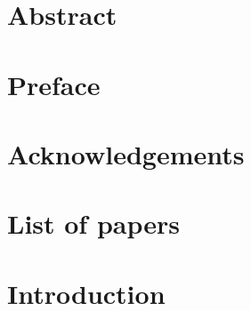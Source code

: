 \documentclass[11pt,b5paper,onecolumn,titlepage,openright,twoside,final]{book}
\begin{document}
\newcommand{\bv}[1]{\mathbfup{#1}}
\newcommand{\bvh}[1]{\hat{\bv{#1}}}
\newcommand{\dd}[0]{\text{d}}
\newcommand{\red}{\color{Red}}
\newcommand{\blu}{\color{Blu}}
\newcommand{\green}{\color{Green}}
\newcommand{\purple}{\color{Purple}}

\pagestyle{empty}
\frontmatter
\chapter*{Abstract}


\chapter*{Preface}


\chapter*{Acknowledgements}


\chapter*{List of papers}


% 

\tableofcontents
\mainmatter

\pagestyle{fancy}
\fancyhead{}
\cfoot{}
\renewcommand{\sectionmark}[1]{\markright{\thesection.\ \textit{#1}}}
\renewcommand{\chaptermark}[1]{\markboth{\chaptername\ \thechapter. #1}{}}
\fancyhead[LO]{\rightmark}
\fancyhead[RO]{\thepage}
\fancyhead[LE]{\thepage}
\fancyhead[RE]{\leftmark}
\chapter{Introduction}

\end{document}
